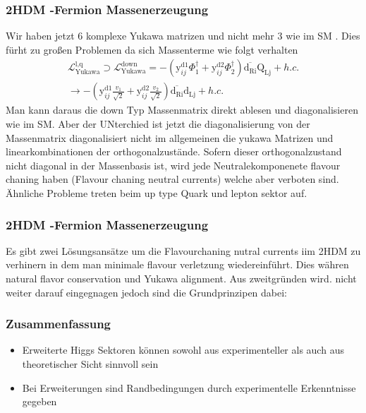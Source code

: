 \documentclass{beamer}
\begin{document}
\begin{frame}
\frametitle{2HDM -Fermion Massenerzeugung}
Wir haben jetzt 6 komplexe Yukawa matrizen und nicht mehr 3 wie im SM . Dies fürht zu großen Problemen da sich Massenterme wie folgt verhalten
\begin{equation}
\begin{split}
\mathscr{L}_{\text{Yukawa}}^{\text{l,q}}\supset \mathscr{L}_{\text{Yukawa}}^{\text{down}} =-(\text{y}^{\text{d1}}_{ij}\Phi_{1}^{\dagger}+\text{y}^{\text{d2}}_{ij}\Phi_{2}^{\dagger})\overline{\text{d}_{\text{Ri}}}\text{Q}_{\text{Lj}} +h.c. \\
\rightarrow -(\text{y}^{\text{d1}}_{ij}\frac{v_{1}}{\sqrt{2}}+\text{y}^{\text{d2}}_{ij}\frac{v_{2}}{\sqrt{2}})\overline{\text{d}_{\text{Ri}}}\text{d}_{\text{Lj}} +h.c. 
\end{split}
\end{equation}
Man kann daraus die down Typ Massenmatrix direkt ablesen und diagonalisieren wie im SM. Aber der UNterchied ist jetzt die diagonalisierung von der Massenmatrix diagonalisiert nicht im allgemeinen die yukawa Matrizen und linearkombinationen der orthogonalzustände. Sofern dieser orthogonalzustand nicht diagonal in der Massenbasis ist, wird jede Neutralekomponenete flavour chaning haben (Flavour chaning neutral currents) welche aber verboten sind. Ähnliche Probleme treten beim up type Quark und lepton sektor auf.
\end{frame}
\begin{frame}
\frametitle{2HDM -Fermion Massenerzeugung}
Es gibt zwei Lösungsansätze um die Flavourchaning nutral currents iim 2HDM zu verhinern in dem man minimale flavour verletzung wiedereinführt. Dies währen natural flavor conservation und Yukawa alignment. Aus zweitgründen wird. nicht weiter darauf eingegnagen jedoch sind die Grundprinzipen dabei:


\end{frame}









\begin{frame}
\frametitle{Zusammenfassung}
\begin{itemize}
\item Erweiterte Higgs Sektoren können sowohl aus experimenteller als auch aus theoretischer Sicht sinnvoll sein
\item Bei Erweiterungen sind Randbedingungen durch experimentelle Erkenntnisse gegeben 
\end{itemize}
\end{frame}
\end{document}
